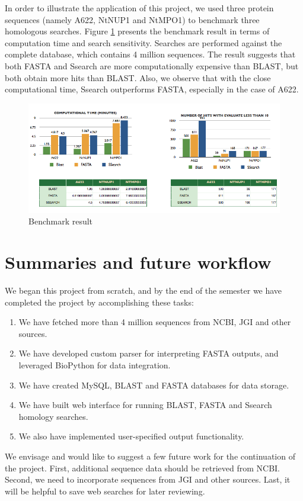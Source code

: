 \documentclass[11pt,letterpaper,twoside,english]{article}
\begin{document}


In order to illustrate the application of this project, we used three
protein sequences (namely A622, NtNUP1 and NtMPO1) to benchmark three
homologous searches. Figure \ref{fig:Benchmark-result} presents the
benchmark result in terms of computation time and search sensitivity.
Searches are performed against the complete database, which contains
4 million sequences. The result suggests that both FASTA and Ssearch
are more computationally expensive than BLAST, but both obtain more
hits than BLAST. Also, we observe that with the close computational
time, Ssearch outperforms FASTA, especially in the case of A622.

%
\begin{figure}[H]
\begin{centering}
\includegraphics[width=0.8\linewidth]{figures/Bench_mark_result}
\par\end{centering}

\caption{\label{fig:Benchmark-result}Benchmark result}

\end{figure}



\section{Summaries and future workflow}

We began this project from scratch, and by the end of the semester
we have completed the project by accomplishing these tasks:
\begin{enumerate}
\item We have fetched more than 4 million sequences from NCBI, JGI and other
sources.
\item We have developed custom parser for interpreting FASTA outputs, and
leveraged BioPython for data integration.
\item We have created MySQL, BLAST and FASTA databases for data storage.
\item We have built web interface for running BLAST, FASTA and Ssearch homology
searches.
\item We also have implemented user-specified output functionality.
\end{enumerate}
We envisage and would like to suggest a few future work for the continuation
of the project. First, additional sequence data should be retrieved
from NCBI. Second, we need to incorporate sequences from JGI and other
sources. Last, it will be helpful to save web searches for later reviewing.
\end{document}
